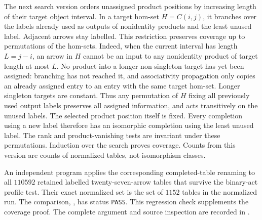 \begin{remark*}
The next search version orders unassigned product positions by increasing
length of their target object interval. In a target hom-set $H=C(i,j)$,
it branches over the labels already used as outputs of nonidentity
products and the least unused label. Adjacent arrows stay labelled.
This restriction preserves coverage up to permutations of the hom-sets.
Indeed, when the current interval has length $L=j-i$, an arrow in $H$
cannot be an input to any nonidentity product of target length at most
$L$. No product into a longer non-singleton target has yet been
assigned: branching has not reached it, and associativity propagation
only copies an already assigned entry to an entry with the same target
hom-set. Longer singleton targets are constant. Thus any permutation
of $H$ fixing all previously used output labels preserves all assigned
information, and acts transitively on the unused labels. The selected
product position itself is fixed. Every completion using a new label
therefore has an isomorphic completion using the least unused label.
The rank and product-vanishing tests are invariant under these
permutations. Induction over the search proves coverage. Counts from
this version are counts of normalized tables, not isomorphism classes.

An independent program applies the corresponding completed-table
renaming to all $110592$ retained labelled twenty-seven-arrow tables
that survive the binary-act profile test. Their exact normalized set
is the set of $1152$ tables in the normalized run. The comparison,
,
has status \texttt{PASS}. This regression check supplements the
coverage proof. The complete argument and source inspection are
recorded in .
\end{remark*}


